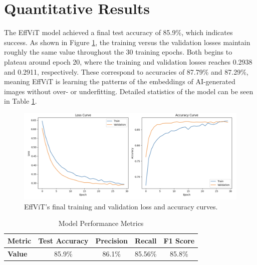 \documentclass{article} %
\begin{document}

\section{Quantitative Results}
\label{quantitative}

The EffViT model achieved a final test accuracy of 85.9\%, which indicates success. As shown in Figure \ref{fig:Training_Curves}, the training versus the validation losses maintain roughly the same value throughout the 30 training epochs. Both begins to plateau around epoch 20, where the training and validation losses reaches 0.2938 and 0.2911, respectively. These correspond to accuracies of 87.79\% and 87.29\%, meaning EffViT is learning the patterns of the embeddings of AI-generated images without over- or underfitting. Detailed statistics of the model can be seen in Table \ref{tab:metrics}.

\begin{figure}[h]
    \begin{center}
        \includegraphics[scale=0.27]{figs/training curves.png}
    \end{center}
    \caption{EffViT's final training and validation loss and accuracy curves.}
    \label{fig:Training_Curves}
\end{figure}

\begin{table}[h]
    \centering
    \caption{Model Performance Metrics}
    \label{tab:metrics}
    \begin{tabular}{lcccc}
        \toprule
        \textbf{Metric} & \textbf{Test Accuracy} & \textbf{Precision} & \textbf{Recall} & \textbf{F1 Score} \\
        \midrule
        \textbf{Value}  & 85.9\%                 & 86.1\%             & 85.56\%         & 85.8\%            \\
        \bottomrule
    \end{tabular}
\end{table}
\end{document}
